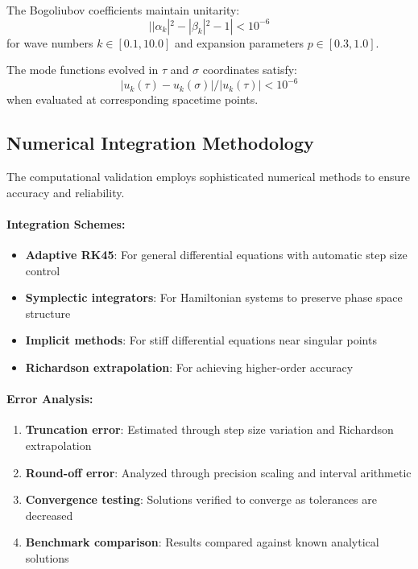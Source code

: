 \begin{theorem}
\label{thm:bogoliubov_unitarity_validation}
The Bogoliubov coefficients maintain unitarity:
\begin{equation}
||\alpha_k|^2 - |\beta_k|^2 - 1| < 10^{-6}
\end{equation}
for wave numbers $k \in [0.1, 10.0]$ and expansion parameters $p \in [0.3, 1.0]$.
\end{theorem}

\begin{theorem}
\label{thm:mode_equivalence_validation}
The mode functions evolved in $\tau$ and $\sigma$ coordinates satisfy:
\begin{equation}
|u_k(\tau) - u_k(\sigma)| / |u_k(\tau)| < 10^{-6}
\end{equation}
when evaluated at corresponding spacetime points.
\end{theorem}

\subsection{Numerical Integration Methodology}
\label{subsec:numerical_methodology}

The computational validation employs sophisticated numerical methods to ensure accuracy and reliability.

\paragraph{Integration Schemes:}
\begin{itemize}
\item \textbf{Adaptive RK45}: For general differential equations with automatic step size control
\item \textbf{Symplectic integrators}: For Hamiltonian systems to preserve phase space structure
\item \textbf{Implicit methods}: For stiff differential equations near singular points
\item \textbf{Richardson extrapolation}: For achieving higher-order accuracy
\end{itemize}

\paragraph{Error Analysis:}
\begin{enumerate}
\item \textbf{Truncation error}: Estimated through step size variation and Richardson extrapolation
\item \textbf{Round-off error}: Analyzed through precision scaling and interval arithmetic
\item \textbf{Convergence testing}: Solutions verified to converge as tolerances are decreased
\item \textbf{Benchmark comparison}: Results compared against known analytical solutions
\end{enumerate}

